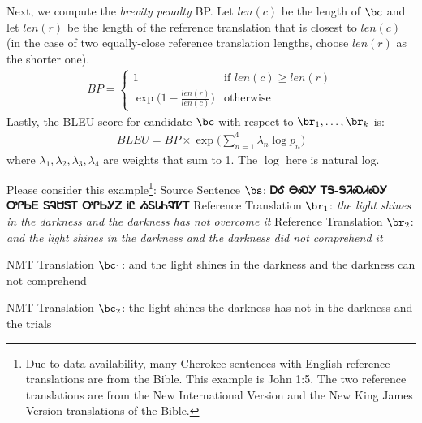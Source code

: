 {\begin{parts}
    Next, we compute the \textit{brevity penalty} BP. Let $len(c)$ be the length of $\bc$ and let $len(r)$ be the length of the reference translation that is closest to $len(c)$ (in the case of two equally-close reference translation lengths, choose $len(r)$ as the shorter one). 
    \begin{align}
        BP = 
        \begin{cases}
            1 & \text{if } len(c) \ge len(r) \\
            \exp \big( 1 - \frac{len(r)}{len(c)} \big) & \text{otherwise}
        \end{cases}
    \end{align}
    Lastly, the BLEU score for candidate $\bc$ with respect to $\br_1,\dots,\br_k$ is:
    \begin{align}
        BLEU = BP \times \exp \Big( \sum_{n=1}^4 \lambda_n \log p_n \Big)
    \end{align}
    where $\lambda_1,\lambda_2,\lambda_3,\lambda_4$ are weights that sum to 1. The $\log$ here is natural log.
    \newline
    \begin{subparts}
        \subpart[5] Please consider this example\footnote{Due to data availability, many Cherokee sentences with English reference translations are from the Bible. This example is John 1:5. The two reference translations are from the New International Version and the New King James Version translations of the Bible.}: \newline
        Source Sentence $\bs$: \textbf{{\cherokeefam ᎠᎴ ᎾᏍᎩ ᎢᎦ-ᎦᏘᏍᏗᏍᎩ ᎤᎵᏏᎬ ᏚᎸᏌᏕᎢ ᎤᎵᏏᎩᏃ ᎥᏝ ᏱᏚᏓᏂᎸᏤᎢ}} 
        \newline
        Reference Translation $\br_1$: \textit{the light shines in the darkness and the darkness has not overcome it}
        \newline
        Reference Translation $\br_2$: \textit{and the light shines in the darkness and the darkness did not comprehend it}
        
        NMT Translation $\bc_1$: and the light shines in the darkness and the darkness can not comprehend
        
        NMT Translation $\bc_2$: the light shines the darkness has not in the darkness and the trials
        

\end{subparts}
\end{parts}}
